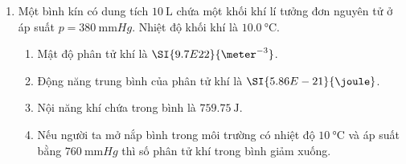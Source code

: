 \begin{enumerate}[label=\bfseries Câu \arabic*:, leftmargin=1.7cm]
\item Một bình kín có dung tích $\SI{10}{\liter}$ chứa một khối khí lí tưởng đơn nguyên tử ở áp suất $p=\SI{380}{\milli\meter Hg}$. Nhiệt độ khối khí là $\SI{10.0}{\celsius}$. 
\begin{enumerate}[label=\alph*)]
	\item Mật độ phân tử khí là $\SI{9.7E22}{\meter^{-3}}$.
	\item Động năng trung bình của phân tử khí là $\SI{5.86E-21}{\joule}$.
	\item Nội năng khí chứa trong bình là $\SI{759.75}{\joule}$.
	\item Nếu người ta mở nắp bình trong môi trường có nhiệt độ $\SI{10}{\celsius}$ và áp suất bằng $\SI{760}{\milli\meter Hg}$ thì số phân tử khí trong bình giảm xuống.
\end{enumerate}

\end{enumerate}
